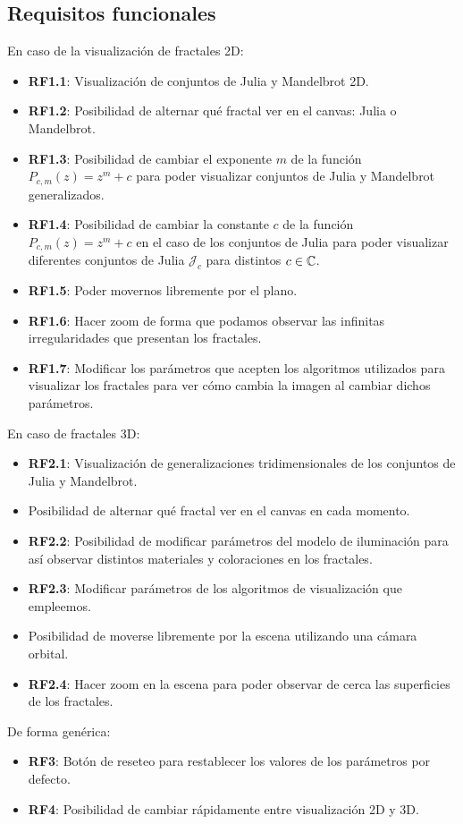 \subsection*{Requisitos funcionales}
En caso de la visualización de fractales 2D:
\begin{itemize}
    \item \textbf{RF1.1}: Visualización de conjuntos de Julia y Mandelbrot 2D.
    \item \textbf{RF1.2}: Posibilidad de alternar qué fractal ver en el canvas: Julia o Mandelbrot.
    \item \textbf{RF1.3}: Posibilidad de cambiar el exponente $m$ de la función $P_{c,m}(z)=z^m+c$ para poder visualizar conjuntos de Julia y Mandelbrot generalizados.
    \item \textbf{RF1.4}: Posibilidad de cambiar la constante $c$ de la función $P_{c,m}(z)=z^m+c$ en el caso de los conjuntos de Julia para poder visualizar diferentes conjuntos de Julia $\mathcal{J}_c$ para distintos $c\in\mathbb{C}$.
    \item \textbf{RF1.5}: Poder movernos libremente por el plano.
    \item \textbf{RF1.6}: Hacer zoom de forma que podamos observar las infinitas irregularidades que presentan los fractales.
    \item \textbf{RF1.7}: Modificar los parámetros que acepten los algoritmos utilizados para visualizar los fractales para ver cómo cambia la imagen al cambiar dichos parámetros.
\end{itemize}
En caso de fractales 3D:
\begin{itemize}
    \item \textbf{RF2.1}: Visualización de generalizaciones tridimensionales de los conjuntos de Julia y Mandelbrot.
    \item Posibilidad de alternar qué fractal ver en el canvas en cada momento.
    \item \textbf{RF2.2}: Posibilidad de modificar parámetros del modelo de iluminación para así observar distintos materiales y coloraciones en los fractales.
    \item \textbf{RF2.3}: Modificar parámetros de los algoritmos de visualización que empleemos.
    \item Posibilidad de moverse libremente por la escena utilizando una cámara orbital.
    \item \textbf{RF2.4}: Hacer zoom en la escena para poder observar de cerca las superficies de los fractales.
\end{itemize}
De forma genérica:
\begin{itemize}
    \item \textbf{RF3}: Botón de reseteo para restablecer los valores de los parámetros por defecto.
    \item \textbf{RF4}: Posibilidad de cambiar rápidamente entre visualización 2D y 3D.
\end{itemize}

